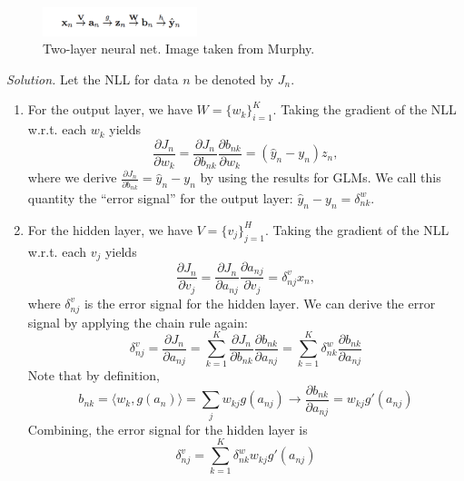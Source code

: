 \documentclass{article}
\begin{document}
\begin{figure}[!ht]
	\centering
	\includegraphics[width = 0.4\textwidth]{ex1.png}
	\caption{Two-layer neural net. Image taken from Murphy.}
	\label{fig:ex1}
\end{figure}

\textit{Solution.} Let the NLL for data $n$ be denoted by $J_n$.
\begin{enumerate}
	\item For the output layer, we have ${W} = \{{w}_k\}_{i=1}^K$. Taking the gradient of the NLL w.r.t. each ${w}_k$ yields
	\[
	\frac{\partial J_n}{\partial {w}_k} 
	= \frac{\partial J_n}{\partial {b}_{nk}} \frac{\partial {b}_{nk}}{\partial {w}_k}
	= (\hat{{y}}_n - {y}_n) {z}_n,
	\]
	where we derive $\frac{\partial J_n}{\partial {b}_{nk}} = \hat{{y}}_n - {y}_n$ by using the results for GLMs. We call this quantity the ``error signal'' for the output layer: $\hat{{y}}_n - {y}_n = \delta_{nk}^w$.
	
	\item For the hidden layer, we have ${V} = \{{v}_j\}_{j=1}^H$. Taking the gradient of the NLL w.r.t. each ${v}_j$ yields
	\[
	\frac{\partial J_n}{\partial {v}_j} 
	= \frac{\partial J_n}{\partial {a}_{nj}} \frac{\partial {a}_{nj}}{\partial {v}_j}
	= \delta_{nj}^v {x}_n,
	\]
	where $\delta_{nj}^v$ is the error signal for the hidden layer. We can derive the error signal by applying the chain rule again:
	\[
	\delta_{nj}^v 
	= \frac{\partial J_n}{\partial {a}_{nj}}
	= \sum_{k=1}^K \frac{\partial J_n}{\partial {b}_{nk}} \frac{\partial {b}_{nk}}{\partial {a}_{nj}}
	= \sum_{k=1}^K \delta_{nk}^w \frac{\partial {b}_{nk}}{\partial {a}_{nj}}
	\]
	Note that by definition, 
	\[
	{b}_{nk} 
	= \langle {w}_k, g({a}_n)\rangle
	= \sum_{j} w_{kj} g(a_{nj})
	\rightarrow
	\frac{\partial {b}_{nk}}{\partial {a}_{nj}}
	= w_{kj} g'(a_{nj})
	\]
	Combining, the error signal for the hidden layer is
	\[
	\delta_{nj}^v = \sum_{k=1}^K \delta_{nk}^w w_{kj} g'(a_{nj})
	\]
\end{enumerate}
\end{document}
